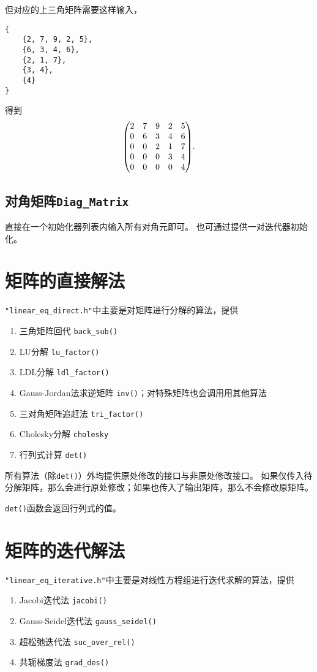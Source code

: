 但对应的上三角矩阵需要这样输入，
{\small
\begin{verbatim}
{
    {2, 7, 9, 2, 5},
    {6, 3, 4, 6},
    {2, 1, 7},
    {3, 4},
    {4}
}
\end{verbatim}
}
得到\[
    \mqty(
        2&7&9&2&5\\
        0&6&3&4&6\\
        0&0&2&1&7\\
        0&0&0&3&4\\
        0&0&0&0&4
    ).
\]

\subsection{对角矩阵\texttt{Diag\_Matrix}}
直接在一个初始化器列表内输入所有对角元即可。
也可通过提供一对迭代器初始化。

\section{矩阵的直接解法}
\texttt{"linear\_eq\_direct.h"}中主要是对矩阵进行分解的算法，提供\begin{enumerate}
    \item 三角矩阵回代 \texttt{back\_sub()}
    \item LU分解 \texttt{lu\_factor()}
    \item LDL分解 \texttt{ldl\_factor()}
    \item Gauss-Jordan法求逆矩阵 \texttt{inv()}；对特殊矩阵也会调用用其他算法
    \item 三对角矩阵追赶法 \texttt{tri\_factor()}
    \item Cholesky分解 \texttt{cholesky}
    \item 行列式计算 \texttt{det()}
\end{enumerate}

所有算法（除\texttt{det()}）外均提供原处修改的接口与非原处修改接口。
如果仅传入待分解矩阵，那么会进行原处修改；如果也传入了输出矩阵，那么不会修改原矩阵。

\texttt{det()}函数会返回行列式的值。

\section{矩阵的迭代解法}
\texttt{"linear\_eq\_iterative.h"}中主要是对线性方程组进行迭代求解的算法，提供\begin{enumerate}
    \item Jacobi迭代法 \texttt{jacobi()}
    \item Gauss-Seidel迭代法 \texttt{gauss\_seidel()}
    \item 超松弛迭代法 \texttt{suc\_over\_rel()}
    \item 共轭梯度法 \texttt{grad\_des()}
\end{enumerate}

